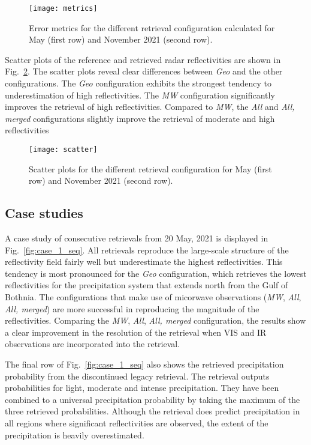 \documentclass[11pt]{scrartcl}
\begin{document}
\begin{figure}
  \centering
  \texttt{[image: metrics]}
  \caption{
    Error metrics for the different retrieval configuration calculated for May (first row) and
    November 2021 (second row).
    }
  \label{fig:metrics}
\end{figure}

Scatter plots of the reference and retrieved radar reflectivities are shown in
Fig.~\ref{fig:scatter}. The scatter plots reveal clear differences between
\textit{Geo} and the other configurations. The \textit{Geo} configuration
exhibits the strongest tendency to underestimation of high reflectivities. The
\textit{MW} configuration significantly improves the retrieval of high
reflectivities. Compared to \textit{MW}, the \textit{All} and \textit{All,
  merged} configurations slightly improve the retrieval of moderate and high
reflectivities


\begin{figure}
  \centering
  \texttt{[image: scatter]}
  \caption{
    Scatter plots for the different retrieval configuration for May (first row) and
    November 2021 (second row).
  }
  \label{fig:scatter}
\end{figure}

\subsection{Case studies}

A case study of consecutive retrievals from 20 May, 2021 is displayed in
Fig.~\ref{fig:case_1_seq}. All retrievals reproduce the large-scale structure of
the reflectivity field fairly well but underestimate the highest reflectivities.
This tendency is most pronounced for the \textit{Geo} configuration, which
retrieves the lowest reflectivities for the precipitation system that extends
north from the Gulf of Bothnia. The configurations that make use of micorwave
observations (\textit{MW}, \textit{All}, \textit{All, merged}) are more
successful in reproducing the magnitude of the reflectivities. Comparing the
\textit{MW}, \textit{All}, \textit{All, merged} configuration, the results show
a clear improvement in the resolution of the retrieval when VIS and IR
observations are incorporated into the retrieval.

The final row of Fig.~\ref{fig:case_1_seq} also shows the retrieved
precipitation probability from the discontinued legacy retrieval. The retrieval
outputs probabilities for light, moderate and intense precipitation. They have
been combined to a universal precipitation probability by taking the maximum of
 the three retrieved probabilities. Although the retrieval does predict
precipitation in all regions where significant reflectivities are observed, the
extent of the precipitation is heavily overestimated.
\end{document}
